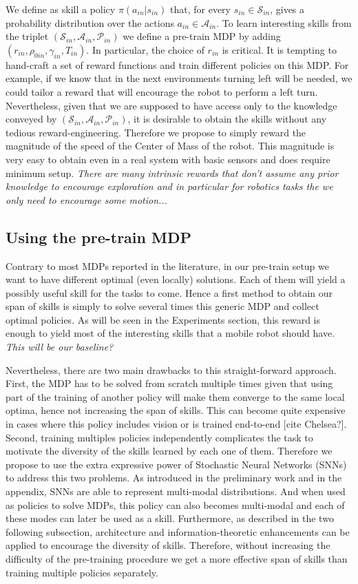 \documentclass{article} %
\begin{document}
We define as skill a policy $\pi(a_{in} | s_{in})$ that, for every $s_{in}\in\mathcal{S}_{in}$, gives a probability distribution over the actions $a_{in}\in\mathcal{A}_{in}$. To learn interesting skills from the triplet $(\mathcal{S}_{in}, \mathcal{A}_{in}, \mathcal{P}_{in})$ we define a pre-train MDP by adding $(r_{in}, \rho_{0in}, \gamma_{in}, T_{in})$. In particular, the choice of $r_{in}$ is critical. It is tempting to hand-craft a set of reward functions and train different policies on this MDP. For example, if we know that in the next environments turning left will be needed, we could tailor a reward that will encourage the robot to perform a left turn. Nevertheless, given that we are supposed to have access only to the knowledge conveyed by $(\mathcal{S}_{in}, \mathcal{A}_{in}, \mathcal{P}_{in})$, it is desirable to obtain the skills without any tedious reward-engineering. Therefore we propose to simply reward the magnitude of the speed of the Center of Mass of the robot. This magnitude is very easy to obtain even in a real system with basic sensors and does require minimum setup. 
\textit{There are many intrinsic rewards that don't assume any prior knowledge to encourage exploration and in particular for robotics tasks the we only need to encourage some motion...}

\subsection{Using the pre-train MDP}
Contrary to most MDPs reported in the literature, in our pre-train setup we want to have different optimal (even locally) solutions. Each of them will yield a possibly useful skill for the tasks to come. Hence a first method to obtain our span of skills is simply to solve several times this generic MDP and collect optimal policies. As will be seen in the Experiments section, this reward is enough to yield most of the interesting skills that a mobile robot should have. \textit{This will be our baseline?}

Nevertheless, there are two main drawbacks to this straight-forward approach. First, the MDP has to be solved from scratch multiple times given that using part of the training of another policy will make them converge to the same local optima, hence not increasing the span of skills. This can become quite expensive in cases where this policy includes vision or is trained end-to-end [cite Chelsea?]. Second, training multiples policies independently complicates the task to motivate the diversity of the skills learned by each one of them. Therefore we propose to use the extra expressive power of Stochastic Neural Networks (SNNs) to address this two problems. As introduced in the preliminary work and in the appendix, SNNs are able to represent multi-modal distributions. And when used as policies to solve MDPs, this policy can also becomes multi-modal and each of these modes can later be used as a skill. Furthermore, as described in the two following subsection, architecture and information-theoretic enhancements can be applied to encourage the diversity of skills. Therefore, without increasing the difficulty of the pre-training procedure we get a more effective span of skills than training multiple policies separately.
\end{document}
